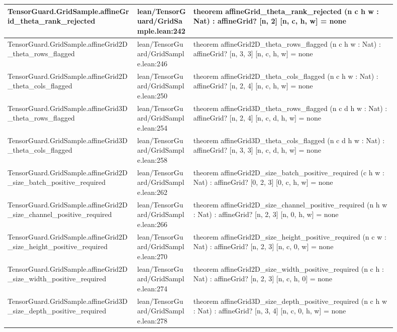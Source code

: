 \documentclass[10pt]{article}
\begin{document}
\begin{longtable}{|p{0.30\linewidth}|p{0.13\linewidth}|p{0.47\linewidth}|}
\hline
TensorGuard.GridSample.affineGrid\_theta\_rank\_rejected & lean/TensorGuard/GridSample.lean:242 & theorem affineGrid\_theta\_rank\_rejected (n c h w : Nat) : affineGrid? [n, 2] [n, c, h, w] = none \\
\hline
TensorGuard.GridSample.affineGrid2D\_theta\_rows\_flagged & lean/TensorGuard/GridSample.lean:246 & theorem affineGrid2D\_theta\_rows\_flagged (n c h w : Nat) : affineGrid? [n, 3, 3] [n, c, h, w] = none \\
\hline
TensorGuard.GridSample.affineGrid2D\_theta\_cols\_flagged & lean/TensorGuard/GridSample.lean:250 & theorem affineGrid2D\_theta\_cols\_flagged (n c h w : Nat) : affineGrid? [n, 2, 4] [n, c, h, w] = none \\
\hline
TensorGuard.GridSample.affineGrid3D\_theta\_rows\_flagged & lean/TensorGuard/GridSample.lean:254 & theorem affineGrid3D\_theta\_rows\_flagged (n c d h w : Nat) : affineGrid? [n, 2, 4] [n, c, d, h, w] = none \\
\hline
TensorGuard.GridSample.affineGrid3D\_theta\_cols\_flagged & lean/TensorGuard/GridSample.lean:258 & theorem affineGrid3D\_theta\_cols\_flagged (n c d h w : Nat) : affineGrid? [n, 3, 3] [n, c, d, h, w] = none \\
\hline
TensorGuard.GridSample.affineGrid2D\_size\_batch\_positive\_required & lean/TensorGuard/GridSample.lean:262 & theorem affineGrid2D\_size\_batch\_positive\_required (c h w : Nat) : affineGrid? [0, 2, 3] [0, c, h, w] = none \\
\hline
TensorGuard.GridSample.affineGrid2D\_size\_channel\_positive\_required & lean/TensorGuard/GridSample.lean:266 & theorem affineGrid2D\_size\_channel\_positive\_required (n h w : Nat) : affineGrid? [n, 2, 3] [n, 0, h, w] = none \\
\hline
TensorGuard.GridSample.affineGrid2D\_size\_height\_positive\_required & lean/TensorGuard/GridSample.lean:270 & theorem affineGrid2D\_size\_height\_positive\_required (n c w : Nat) : affineGrid? [n, 2, 3] [n, c, 0, w] = none \\
\hline
TensorGuard.GridSample.affineGrid2D\_size\_width\_positive\_required & lean/TensorGuard/GridSample.lean:274 & theorem affineGrid2D\_size\_width\_positive\_required (n c h : Nat) : affineGrid? [n, 2, 3] [n, c, h, 0] = none \\
\hline
TensorGuard.GridSample.affineGrid3D\_size\_depth\_positive\_required & lean/TensorGuard/GridSample.lean:278 & theorem affineGrid3D\_size\_depth\_positive\_required (n c h w : Nat) : affineGrid? [n, 3, 4] [n, c, 0, h, w] = none \\

\end{longtable}
\end{document}
